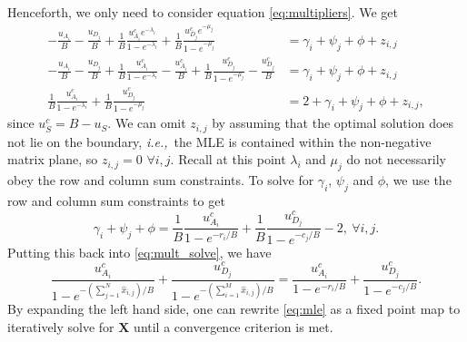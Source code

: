 \documentclass[12pt]{article}
\numberwithin{equation}{section}
\numberwithin{table}{section}
\numberwithin{figure}{section}
\newcommand{\be}{\begin{equation}}
\newcommand{\ee}{\end{equation}}
\newcommand{\ben}{\begin{equation*}}
\newcommand{\een}{\end{equation*}}
\def\ie{\textit{i.e.,}}
\def\bX{\mathbf{X}}
\begin{document}
Henceforth, we only need to consider equation \autoref{eq:multipliers}. We get
\begin{align}
\nonumber
- \frac{u_{A_i}}{B} - \frac{u_{D_j}}{B} + \frac{1}{B} \frac{u^c_{A_i} e^{-\lambda_i}}{1-e^{-\lambda_i}} + \frac{1}{B} \frac{u^c_{D_j} e^{-\mu_j}}{1-e^{-
\mu_j}} &= \gamma_i + \psi_j +\phi +  z_{i,j}\\
\nonumber
- \frac{u_{A_i}}{B} - \frac{u_{D_j}}{B} + \frac{1}{B} \frac{u^c_{A_i}}{1-e^{-\lambda_i}}  - \frac{u^c_{A_i}}{B} + \frac{1}{B}  \frac{u^c_{D_j} }{1-e^{-\mu_j}} - \frac{u^c_{D_j}}{B}
&= \gamma_i + \psi_j + \phi+ z_{i,j}\\
\label{eq:mult_solve}
\frac{1}{B} \frac{u^c_{A_i} }{1-e^{-\lambda_i}} + \frac{1}{B} \frac{u^c_{D_j} }{1-e^{-\mu_j}} &= 2 + \gamma_i + \psi_j +  \phi + z_{i,j},
\end{align}
since $u^c_{S} = B - u_{S}$. We can omit $z_{i,j}$ by assuming that the optimal solution does not lie on the boundary, \ie~the MLE is contained 
within the non-negative matrix plane, so $z_{i,j} = 0$ $\forall i,j$. Recall at this point $\lambda_i$ and $\mu_j$ do not necessarily obey the row 
and column sum constraints. To solve for $\gamma_i$, $\psi_j$ and $\phi$, we use the row and column sum constraints to get
\ben
\gamma_i + \psi_j + \phi =\frac{1}{B} \frac{u^c_{A_i} }{1-e^{-r_i/B}} + \frac{1}{B} \frac{u^c_{D_j} }{1-e^{-c_j/B}} - 2,\ \forall i,j.
\een
Putting this back into \autoref{eq:mult_solve}, we have
\be
 \frac{u^c_{A_i} }{1-e^{-(\sum_{j=1}^N \hat{x}_{i,j})/B}} + \frac{u^c_{D_j} }{1-e^{-(\sum_{i=1}^M \hat{x}_{i,j})/B}} = \frac{u^c_{A_i} }{1-e^{-r_i/B}} + \frac{u^c_{D_j} }{1-e^{-c_j/B}}.
 \label{eq:mle}
\ee
By expanding the left hand side, one can rewrite \autoref{eq:mle} as a fixed point map to iteratively solve for $\bX$ until a convergence
criterion is met.
\end{document}
